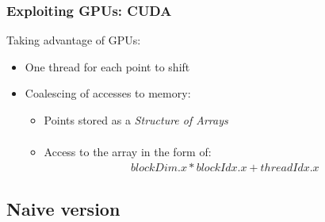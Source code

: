 \documentclass[xcolor=table]{beamer}
\begin{document}
\begin{frame}
\frametitle{Exploiting GPUs: CUDA}
Taking advantage of GPUs:
\vspace{0.45cm}
\begin{itemize}
\item One thread for each point to shift
\vspace{0.35cm}
\item Coalescing of accesses to memory:
\vspace{0.25cm}
\begin{itemize}
\item Points stored as a \emph{Structure of Arrays}
\begin{align}
[x_{}, \ldots , x_{n}, y_{1}, \ldots, y_{n}, z_{1}, \ldots , z_{n}]
\end{align}
\item Access to the array in the form of:
\begin{align}
blockDim.x*blockIdx.x+threadIdx.x
\end{align}
\end{itemize}
\end{itemize}
\end{frame}


\subsection{Naive version}
\end{document}
